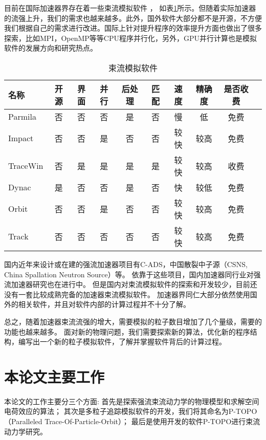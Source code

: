 目前在国际加速器界存在着一些束流模拟软件
\cite{cern_codeList,takeda1998PARMILA,qiang1999impact,uriot2014tracewin,tanke2002dynac,shishlo2006orbit,aseev2005track}，
如表\ref{tab:space_charge_code}所示。但随着实际加速器的流强上升，我们的需求也越来越多。此外，国外软件大部分都不是开源，不方便我们根据自己的需求进行改进。国际上针对提升程序的效率提升方面也做出了很多探索，比如MPI，OpenMP等等CPU程序并行化，另外，GPU并行计算也是模拟软件的发展方向和研究热点。

\begin{table}
  \centering
  \begin{tabular}{|>{\small}l|c|c|c|c|c|c|c|c|c|}
    \hline
    名称	    &开源  &界面 &并行	&后处理     &匹配	&速度 &精确度	 & 是否收费  \\
    \hline
    Parmila  	&否	   &否	     &否	&是	          &否	&慢	  &低	     & 免费	\\
    Impact  	&否	   &否	     &是	&否	          &否	&较快 &较高	     & 免费	\\
    TraceWin  	&否	   &是	     &是	&是	          &是	&较快 &较高	     & 收费	\\
    Dynac  	    &是	   &否	     &否	&是	          &否	&快   &较低	     & 免费	\\
    Orbit  	    &否	   &否	     &是	&否	          &否	&较快 &较高	     & 免费	\\
    Track  	    &否	   &否	     &否	&否	          &否	&较快 &较高	     & 免费	\\
    \hline
  \end{tabular}
  \caption{束流模拟软件}
  \label{tab:space_charge_code}
\end{table}

国内近年来设计或在建的强流加速器项目有C-ADS，中国散裂中子源（CSNS, China Spallation Neutron Source）等。
依靠于这些项目，国内加速器同行业对强流加速器研究也在进行中。
但是国内对束流模拟软件的探索和开发较少，目前还没有一套比较成熟完备的加速器束流模拟软件。
加速器界同仁大部分依然使用国外的相关软件，并且对软件内部的计算过程并不十分了解。

总之，随着加速器束流流强的增大，需要模拟的粒子数目增加了几个量级，需要的功能也越来越多。
面对新的物理问题，我们需要探索新的算法，优化新的程序结构，编写出一个新的粒子模拟软件，了解并掌握软件背后的计算过程。

\section{本论文主要工作}
本论文的工作主要分三个方面:
首先是探索强流束流动力学的物理模型和求解空间电荷效应的算法；
其次是多粒子追踪模拟软件的开发，我们将其命名为P-TOPO（Paralleled Trace-Of-Particle-Orbit）；
最后是使用开发的软件P-TOPO进行束流动力学研究。

